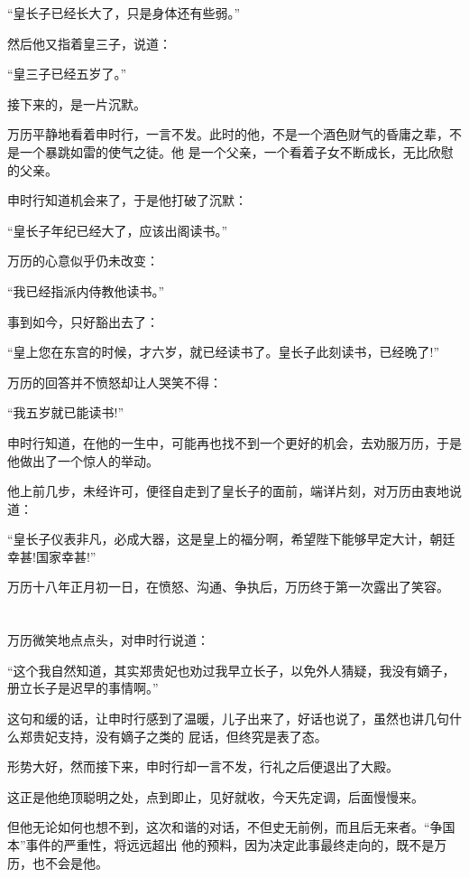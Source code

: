 \documentclass[11pt,a4paper,onecolumn]{article}
\begin{document}
``皇长子已经长大了，只是身体还有些弱。''

然后他又指着皇三子，说道：

``皇三子已经五岁了。''

接下来的，是一片沉默。

万历平静地看着申时行，一言不发。此时的他，不是一个酒色财气的昏庸之辈，不是一个暴跳如雷的使气之徒。他
是一个父亲，一个看着子女不断成长，无比欣慰的父亲。

申时行知道机会来了，于是他打破了沉默：

``皇长子年纪已经大了，应该出阁读书。''

万历的心意似乎仍未改变：

``我已经指派内侍教他读书。''

事到如今，只好豁出去了：

``皇上您在东宫的时候，才六岁，就已经读书了。皇长子此刻读书，已经晚了!''

万历的回答并不愤怒却让人哭笑不得：

``我五岁就已能读书!''

申时行知道，在他的一生中，可能再也找不到一个更好的机会，去劝服万历，于是他做出了一个惊人的举动。

他上前几步，未经许可，便径自走到了皇长子的面前，端详片刻，对万历由衷地说道：

``皇长子仪表非凡，必成大器，这是皇上的福分啊，希望陛下能够早定大计，朝廷幸甚!国家幸甚!''

万历十八年正月初一日，在愤怒、沟通、争执后，万历终于第一次露出了笑容。

\section[\thesection]{}

万历微笑地点点头，对申时行说道：

``这个我自然知道，其实郑贵妃也劝过我早立长子，以免外人猜疑，我没有嫡子，册立长子是迟早的事情啊。''

这句和缓的话，让申时行感到了温暖，儿子出来了，好话也说了，虽然也讲几句什么郑贵妃支持，没有嫡子之类的
屁话，但终究是表了态。

形势大好，然而接下来，申时行却一言不发，行礼之后便退出了大殿。

这正是他绝顶聪明之处，点到即止，见好就收，今天先定调，后面慢慢来。

但他无论如何也想不到，这次和谐的对话，不但史无前例，而且后无来者。``争国本''事件的严重性，将远远超出
他的预料，因为决定此事最终走向的，既不是万历，也不会是他。
\end{document}
